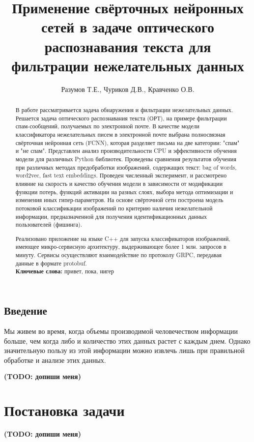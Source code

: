 \documentclass[12pt]{article}
\title{Применение свёрточных нейронных сетей в задаче оптического распознавания текста для фильтрации нежелательных данных}
\author{Разумов Т.Е., Чуриков Д.В., Кравченко О.В.}
\begin{document}
\maketitle

\begin{abstract}
В работе рассматривается задача обнаружения и фильтрации нежелательных данных. Решается задача оптического распознавания текста (ОРТ), на примере фильтрации спам-сообщений, получаемых по электронной почте. В качестве модели классификатора нежелательных писем в электронной почте выбрана полносвязная свёрточная нейронная сеть (FCNN), которая разделяет письма на две категории: "спам" и "не спам". Представлен анализ производительности CPU и эффективности обучения модели для различных Python библиотек. Проведены сравнения результатов обучения при различных методах предобработки изображений, содержащих текст: bag of words, word2vec, fast text embeddings. Проведен численный эксперимент, и рассмотрено влияние на скорость и качество обучения модели в зависимости от модификации функции потерь, функций активации на разных слоях, выбора метода оптимизации и изменения иных гипер-параметров. На основе свёрточной сети построена модель потоковой классификации изображений по критерию наличия нежелательной информации, предназначенной для получения идентификационных данных пользователей (фишинга).


Реализовано приложение на языке C++ для запуска классификаторов изображений, имеющее микро-сервисную архитектуру, выдерживающее более 1 млн. запросов в минуту. Сервисы осуществляют взаимодействие по протоколу GRPC, передавая данные в формате protobuf.\\
\textbf{Ключевые слова:} привет, пока, нигер
\end{abstract}


\subsection*{Введение}
Мы живем во время, когда объемы производимой человечеством
информации больше, чем когда либо и количество этих данных растет с каждым
днем. Однако значительную пользу из этой информации можно извлечь лишь
при правильной обработке и анализе этих данных.

{\bf\color{amaranth} (TODO: допиши меня)}


\section{Постановка задачи}
{\bf\color{ao} (TODO: допиши меня)}
\end{document}
